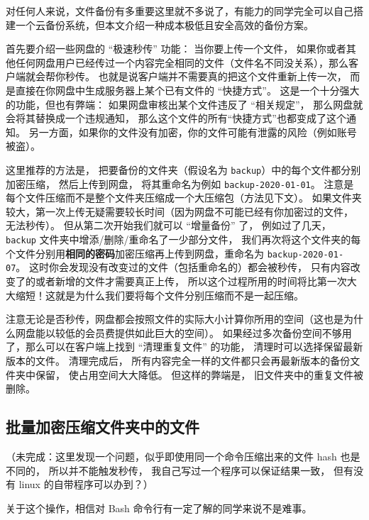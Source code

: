 
对任何人来说，文件备份有多重要这里就不多说了，有能力的同学完全可以自己搭建一个云备份系统，但本文介绍一种成本极低且安全高效的备份方案。

首先要介绍一些网盘的 “极速秒传” 功能： 当你要上传一个文件， 如果你或者其他任何网盘用户已经传过一个内容完全相同的文件（文件名不同没关系），那么客户端就会帮你秒传。 也就是说客户端并不需要真的把这个文件重新上传一次， 而是直接在你网盘中生成服务器上某个已有文件的 “快捷方式”。 这是一个十分强大的功能，但也有弊端： 如果网盘审核出某个文件违反了 “相关规定”， 那么网盘就会将其替换成一个违规通知， 那么这个文件的所有“快捷方式”也都变成了这个通知。 另一方面，如果你的文件没有加密，你的文件可能有泄露的风险（例如账号被盗）。

这里推荐的方法是， 把要备份的文件夹（假设名为 \verb|backup|）中的每个文件都分别加密压缩， 然后上传到网盘， 将其重命名为例如 \verb|backup-2020-01-01|。 注意是每个文件压缩而不是整个文件夹压缩成一个大压缩包（方法见下文）。 如果文件夹较大，第一次上传无疑需要较长时间（因为网盘不可能已经有你加密过的文件， 无法秒传）。 但从第二次开始我们就可以 “增量备份” 了， 例如过了几天， \verb|backup| 文件夹中增添/删除/重命名了一少部分文件， 我们再次将这个文件夹的每个文件分别用\textbf{相同的密码}加密压缩再上传到网盘，重命名为 \verb|backup-2020-01-07|。 这时你会发现没有改变过的文件（包括重命名的）都会被秒传， 只有内容改变了的或者新增的文件才需要真正上传， 所以这个过程所用的时间将比第一次大大缩短！这就是为什么我们要将每个文件分别压缩而不是一起压缩。

注意无论是否秒传，网盘都会按照文件的实际大小计算你所用的空间（这也是为什么网盘能以较低的会员费提供如此巨大的空间）。 如果经过多次备份空间不够用了，那么可以在客户端上找到 “清理重复文件” 的功能， 清理时可以选择保留最新版本的文件。 清理完成后， 所有内容完全一样的文件都只会再最新版本的备份文件夹中保留， 使占用空间大大降低。 但这样的弊端是， 旧文件夹中的重复文件被删除。

\subsection{批量加密压缩文件夹中的文件}

（未完成：这里发现一个问题，似乎即使用同一个命令压缩出来的文件 hash 也是不同的， 所以并不能触发秒传， 我自己写过一个程序可以保证结果一致， 但有没有 linux 的自带程序可以办到？）

关于这个操作，相信对 Bash 命令行有一定了解的同学来说不是难事。

